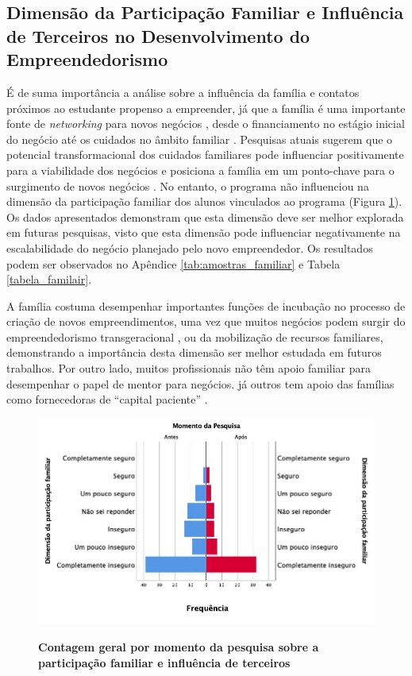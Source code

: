 \subsection{Dimensão da Participação Familiar e Influência de Terceiros no Desenvolvimento do Empreendedorismo}

É de suma importância a análise sobre a influência da família e contatos próximos ao estudante propenso a empreender, já que a família é uma importante fonte de \textit{networking} para novos negócios \cite{soto_does_2019,raza_influence_2019,kupp_when_2019}, desde o financiamento no estágio inicial do negócio \cite{soto_does_2019,edelman_impact_2016} até os cuidados no âmbito familiar \cite{meliou_family_2020}  \cite{puzi_transgenerational_2020}. Pesquisas atuais sugerem que o potencial transformacional dos cuidados familiares pode influenciar positivamente para a viabilidade dos negócios e posiciona a família em um ponto-chave para o surgimento de novos negócios \cite{georgescu_impact_2020,jena_measuring_2020,porfirio_family_2020}. No entanto, o programa não influenciou na dimensão da participação familiar dos alunos vinculados ao programa (Figura \ref{figura_60}). Os dados apresentados demonstram que esta dimensão deve ser melhor explorada em futuras pesquisas, visto que esta dimensão pode influenciar negativamente na escalabilidade do negócio planejado pelo novo empreendedor. Os resultados podem ser observados no Apêndice \ref{tab:amostras_familiar} e Tabela \ref{tabela_familair}.


A família costuma desempenhar importantes funções de incubação no processo de criação de novos empreendimentos, uma vez que muitos negócios podem surgir do empreendedorismo transgeracional \cite{puzi_transgenerational_2020,meliou_family_2020}, ou da mobilização de recursos familiares, demonstrando a importância desta dimensão ser melhor estudada em futuros trabalhos. Por outro lado, muitos profissionais não têm apoio familiar para desempenhar o papel de mentor para negócios. já outros tem apoio das famílias como fornecedoras de “capital paciente” \cite{lumpkin_longterm_2011}.


\begin{figure}[H]
\centering
\caption{\textbf{Contagem geral por momento da pesquisa sobre a participação familiar e influência de terceiros}}
\includegraphics[scale=0.4]{Imagens/dimensao_familiar.jpg}
\label{figura_60}
\end{figure}


